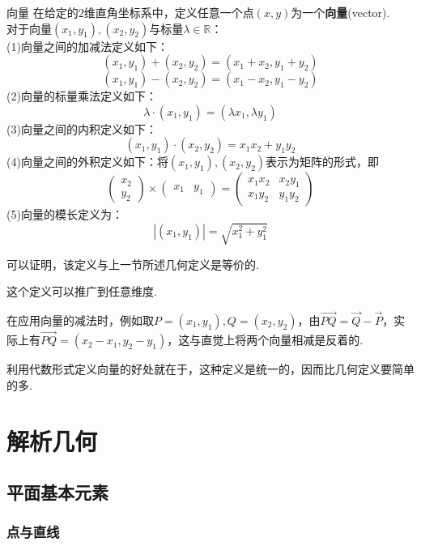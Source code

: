\documentclass[lang=cn, zihao=5]{elegantbook}
\newcommand{\xl}[1]{\overrightarrow{#1}}
\newcommand{\R}{\mathbb{R}}
\begin{document}
\begin{definition}{向量}
	在给定的$2$维直角坐标系中，定义任意一个点$(x,y)$为一个\textbf{向量}(vector). \\
	对于向量$(x_1,y_1),(x_2,y_2)$与标量$\lambda \in \R$： \\
	(1)向量之间的加减法定义如下：
	$$(x_1,y_1) + (x_2,y_2) = (x_1+x_2,y_1+y_2)$$
	$$(x_1,y_1) - (x_2,y_2) = (x_1-x_2,y_1-y_2)$$
	(2)向量的标量乘法定义如下：$$\lambda \cdot (x_1,y_1) = (\lambda x_1, \lambda y_1)$$
	(3)向量之间的内积定义如下：$$(x_1,y_1) \cdot (x_2,y_2) = x_1x_2 + y_1y_2$$
	(4)向量之间的外积定义如下：将$(x_1,y_1),(x_2,y_2)$表示为矩阵的形式，即$$\begin{pmatrix}
		x_2 \\ y_2 \end{pmatrix} \times \begin{pmatrix}
			x_1 & y_1 \end{pmatrix} = \begin{pmatrix}
				x_1x_2 & x_2y_1 \\ x_1y_2 & y_1y_2
			\end{pmatrix}$$
	(5)向量的模长定义为：$$|(x_1,y_1)|=\sqrt{x_1^2+y_1^2}$$
\end{definition}
\begin{remark}
	可以证明，该定义与上一节所述几何定义是等价的.
\end{remark}
\begin{remark}
	这个定义可以推广到任意维度.
\end{remark}
\begin{note}
	在应用向量的减法时，例如取$P=(x_1,y_1),Q=(x_2,y_2)$，由$\xl{PQ}=\xl{Q}-\xl{P}$，实际上有$\xl{PQ}=(x_2-x_1,y_2-y_1)$，这与直觉上将两个向量相减是反着的.
\end{note}

利用代数形式定义向量的好处就在于，这种定义是统一的，因而比几何定义要简单的多.

\chapter{解析几何}

\section{平面基本元素}

\subsection{点与直线}
\end{document}
